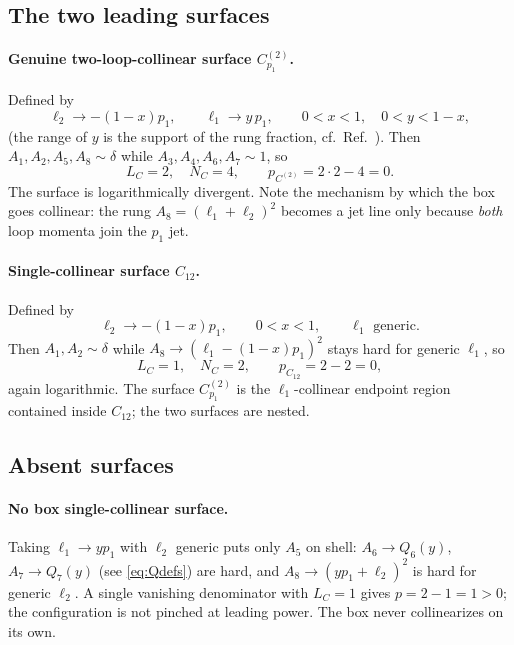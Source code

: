 \documentclass[11pt]{article}
\begin{document}
\subsection{The two leading surfaces}

\paragraph{Genuine two-loop-collinear surface $C^{(2)}_{p_1}$.}
Defined by
\begin{equation}
\ell_2\to -(1-x)p_1,\qquad \ell_1\to y\,p_1,
\qquad 0<x<1,\quad 0<y<1-x ,
\label{eq:C2def}
\end{equation}
(the range of $y$ is the support of the rung fraction, cf.\ Ref.~\cite{kernel}).
Then $A_1,A_2,A_5,A_8\sim\delta$ while $A_3,A_4,A_6,A_7\sim 1$, so
\begin{equation}
L_C=2,\quad N_C=4,\qquad p_{C^{(2)}}=2\cdot2-4=0 .
\end{equation}
The surface is logarithmically divergent. Note the mechanism by which the box goes collinear: the
rung $A_8=(\ell_1+\ell_2)^2$ becomes a jet line only because \emph{both} loop momenta join the
$p_1$ jet.

\paragraph{Single-collinear surface $C_{12}$.}
Defined by
\begin{equation}
\ell_2\to -(1-x)p_1,\qquad 0<x<1,\qquad \ell_1 \text{ generic}.
\end{equation}
Then $A_1,A_2\sim\delta$ while $A_8\to(\ell_1-(1-x)p_1)^2$ stays hard for generic $\ell_1$, so
\begin{equation}
L_C=1,\quad N_C=2,\qquad p_{C_{12}}=2-2=0 ,
\end{equation}
again logarithmic. The surface $C^{(2)}_{p_1}$ is the $\ell_1$-collinear endpoint region contained
inside $C_{12}$; the two surfaces are nested.

\subsection{Absent surfaces}
\label{sec:absent}

\paragraph{No box single-collinear surface.} Taking $\ell_1\to y p_1$ with $\ell_2$ generic puts
only $A_5$ on shell: $A_6\to Q_6(y)$, $A_7\to Q_7(y)$ (see \eqref{eq:Qdefs}) are hard, and
$A_8\to(y p_1+\ell_2)^2$ is hard for generic $\ell_2$. A single vanishing denominator with
$L_C=1$ gives $p=2-1=1>0$; the configuration is not pinched at leading power. The box never
collinearizes on its own.
\end{document}

